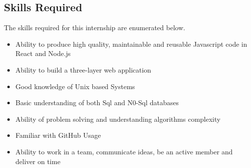 \subsection{ Skills Required }
The skills required for this internship are enumerated below.
\begin{itemize}
\item Ability to produce high quality, maintainable and reusable Javascript code in React and Node.js
\item Ability to build a three-layer web application
\item Good knowledge of Unix based Systems
\item Basic understanding of both Sql and N0-Sql databases
\item Ability of problem solving and understanding algorithms complexity
\item Familiar with GitHub Usage
\item Ability to work in a team, communicate ideas, be an active member and deliver on time
\end{itemize}
